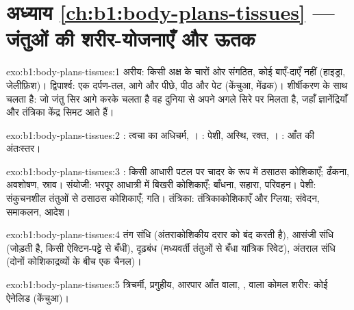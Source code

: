 \section*{अध्याय \ref{ch:b1:body-plans-tissues} --- जंतुओं की शरीर-योजनाएँ और ऊतक}

\begin{solution}{exo:b1:body-plans-tissues:1}
अरीय: किसी अक्ष के चारों ओर संगठित, कोई बाएँ-दाएँ नहीं (हाइड्रा,
जेलीफ़िश)। द्विपार्श्व: एक दर्पण-तल, आगे और पीछे, पीठ और पेट
(केंचुआ, मेंढक)। शीर्षीकरण  के साथ चलता है: जो जंतु
सिर आगे करके चलता है वह दुनिया से अपने अगले सिरे पर मिलता है, जहाँ
ज्ञानेंद्रियाँ और तंत्रिका केंद्र सिमट आते हैं।
\end{solution}

\begin{solution}{exo:b1:body-plans-tissues:2}
: त्वचा का अधिचर्म, । : पेशी, अस्थि,
रक्त, । : आँत की अंतःस्तर।
\end{solution}

\begin{solution}{exo:b1:body-plans-tissues:3}
: किसी आधारी पटल पर चादर के रूप में ठसाठस  कोशिकाएँ;
ढँकना, अवशोषण, स्राव। संयोजी: भरपूर आधात्री में बिखरी कोशिकाएँ;
बाँधना, सहारा, परिवहन। पेशी: संकुचनशील तंतुओं से ठसाठस कोशिकाएँ;
गति। तंत्रिका: तंत्रिकाकोशिकाएँ और ग्लिया; संवेदन,
समाकलन, आदेश।
\end{solution}

\begin{solution}{exo:b1:body-plans-tissues:4}
तंग संधि (अंतराकोशिकीय दरार को बंद करती है), आसंजी संधि
(जोड़ती है, किसी ऐक्टिन-पट्टे से बँधी), दृढ़बंध (मध्यवर्ती तंतुओं से बँधा
यांत्रिक रिवेट), अंतराल संधि (दोनों कोशिकाद्रव्यों के बीच एक
चैनल)।
\end{solution}

\begin{solution}{exo:b1:body-plans-tissues:5}
त्रिचर्मी, प्रगुहीय, आरपार आँत वाला, ,  वाला
कोमल शरीर: कोई ऐनेलिड (केंचुआ)।
\end{solution}

